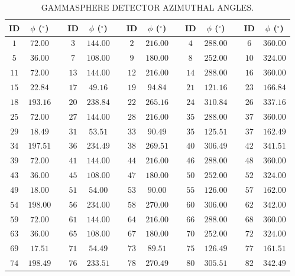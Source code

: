 \begin{table}
\caption{GAMMASPHERE DETECTOR AZIMUTHAL ANGLES.\label{tbl:app1-gs-detectors}}
\begin{center}
\begin{tabular}{|c|c|c|c|c|c|c|c|c|c|c|c|c|c|}
\hline
\hline
ID & $\phi$ ($^{\circ}$) & & ID & $\phi$ ($^{\circ}$) & & ID & $\phi$ ($^{\circ}$) & & ID & $\phi$ ($^{\circ}$) & & ID & $\phi$ ($^{\circ}$)\\
\hline{}  $1$& $72.00$& &  $3$&$144.00$& &  $2$&$216.00$& &  $4$&$288.00$& &  $6$&$360.00$\\
\hline{}  $5$& $36.00$& &  $7$&$108.00$& &  $9$&$180.00$& &  $8$&$252.00$& & $10$&$324.00$\\
\hline{} $11$& $72.00$& & $13$&$144.00$& & $12$&$216.00$& & $14$&$288.00$& & $16$&$360.00$\\
\hline{} $15$& $22.84$& & $17$& $49.16$& & $19$& $94.84$& & $21$&$121.16$& & $23$&$166.84$\\
\hline{} $18$&$193.16$& & $20$&$238.84$& & $22$&$265.16$& & $24$&$310.84$& & $26$&$337.16$\\
\hline{} $25$& $72.00$& & $27$&$144.00$& & $28$&$216.00$& & $35$&$288.00$& & $37$&$360.00$\\ 
\hline{} $29$& $18.49$& & $31$& $53.51$& & $33$& $90.49$& & $35$&$125.51$& & $37$&$162.49$\\
\hline{} $34$&$197.51$& & $36$&$234.49$& & $38$&$269.51$& & $40$&$306.49$& & $42$&$341.51$\\
\hline{} $39$& $72.00$& & $41$&$144.00$& & $44$&$216.00$& & $46$&$288.00$& & $48$&$360.00$\\ 
\hline{} $43$& $36.00$& & $45$&$108.00$& & $47$&$180.00$& & $50$&$252.00$& & $52$&$324.00$\\ 
\hline{} $49$& $18.00$& & $51$& $54.00$& & $53$& $90.00$& & $55$&$126.00$& & $57$&$162.00$\\
\hline{} $54$&$198.00$& & $56$&$234.00$& & $58$&$270.00$& & $60$&$306.00$& & $62$&$342.00$\\
\hline{} $59$& $72.00$& & $61$&$144.00$& & $64$&$216.00$& & $66$&$288.00$& & $68$&$360.00$\\
\hline{} $63$& $36.00$& & $65$&$108.00$& & $67$&$180.00$& & $70$&$252.00$& & $72$&$324.00$\\
\hline{} $69$& $17.51$& & $71$& $54.49$& & $73$& $89.51$& & $75$&$126.49$& & $77$&$161.51$\\
\hline{} $74$&$198.49$& & $76$&$233.51$& & $78$&$270.49$& & $80$&$305.51$& & $82$&$342.49$\\

\end{tabular}
\end{center}
\end{table}
